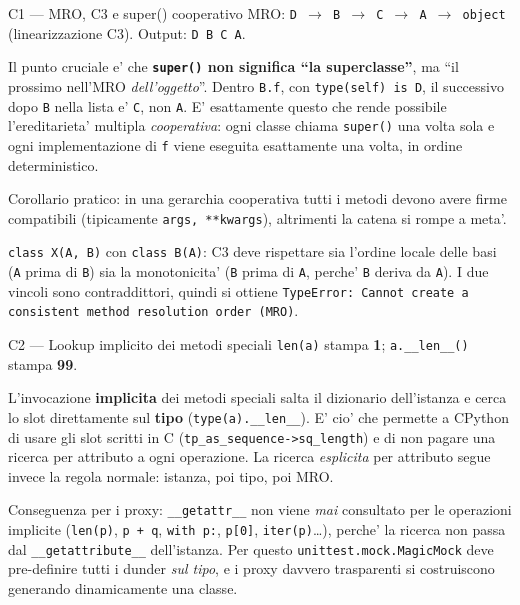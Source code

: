 \documentclass{report}
\newcommand{\code}[1]{\texttt{\small #1}}
\newcommand{\dunder}[1]{\texttt{\small \_\_#1\_\_}}
\begin{document}
\begin{soluzione}{C1 --- MRO, C3 e super() cooperativo}
\label{sol:C1}
MRO: \code{D $\rightarrow$ B $\rightarrow$ C $\rightarrow$ A $\rightarrow$
object} (linearizzazione C3). Output: \code{D B C A}.

Il punto cruciale e' che \textbf{\code{super()} non significa ``la
superclasse''}, ma ``il prossimo nell'MRO \emph{dell'oggetto}''. Dentro
\code{B.f}, con \code{type(self) is D}, il successivo dopo \code{B} nella lista
e' \code{C}, non \code{A}. E' esattamente questo che rende possibile
l'ereditarieta' multipla \emph{cooperativa}: ogni classe chiama \code{super()}
una volta sola e ogni implementazione di \code{f} viene eseguita esattamente una
volta, in ordine deterministico.

Corollario pratico: in una gerarchia cooperativa tutti i metodi devono avere
firme compatibili (tipicamente \code{*args, **kwargs}), altrimenti la catena si
rompe a meta'.

\code{class X(A, B)} con \code{class B(A)}: C3 deve rispettare sia l'ordine
locale delle basi (\code{A} prima di \code{B}) sia la monotonicita' (\code{B}
prima di \code{A}, perche' \code{B} deriva da \code{A}). I due vincoli sono
contraddittori, quindi si ottiene
\code{TypeError: Cannot create a consistent method resolution order (MRO)}.
\end{soluzione}

\begin{soluzione}{C2 --- Lookup implicito dei metodi speciali}
\label{sol:C2}
\code{len(a)} stampa \textbf{1}; \code{a.\_\_len\_\_()} stampa \textbf{99}.

L'invocazione \textbf{implicita} dei metodi speciali salta il dizionario
dell'istanza e cerca lo slot direttamente sul \textbf{tipo}
(\code{type(a).\_\_len\_\_}). E' cio' che permette a CPython di usare gli slot
scritti in C (\code{tp\_as\_sequence->sq\_length}) e di non pagare una ricerca
per attributo a ogni operazione. La ricerca \emph{esplicita} per attributo
segue invece la regola normale: istanza, poi tipo, poi MRO.

Conseguenza per i proxy: \dunder{getattr} non viene \emph{mai} consultato per le
operazioni implicite (\code{len(p)}, \code{p + q}, \code{with p:},
\code{p[0]}, \code{iter(p)}\dots), perche' la ricerca non passa dal
\dunder{getattribute} dell'istanza. Per questo \code{unittest.mock.MagicMock}
deve pre-definire tutti i dunder \emph{sul tipo}, e i proxy davvero trasparenti
si costruiscono generando dinamicamente una classe.
\end{soluzione}
\end{document}
